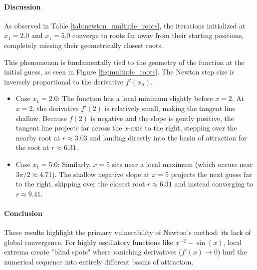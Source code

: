 \begin{solution}
	\paragraph{Discussion}
	As observed in Table \ref{tab:newton_multiple_roots}, the iterations
	initialized at $x_1 = 2.0$ and $x_1 = 5.0$ converge to roots far away from
	their starting positions, completely missing their geometrically closest
	roots.

	This phenomenon is fundamentally tied to the geometry of the function at the
	initial guess, as seen in Figure \ref{fig:multiple_roots}. The Newton step
	size is inversely proportional to the derivative $f'(x_n)$.
	\begin{itemize}
		\item Case $x_1 = 2.0$: The function has a local minimum
		      slightly before $x=2$. At $x=2$, the derivative $f'(2)$ is relatively
		      small, making the tangent line shallow. Because $f(2)$ is negative and
		      the slope is gently positive, the tangent line projects far across the
		      $x$-axis to the right, stepping over the nearby root at $r \approx 3.03$
		      and landing directly into the basin of attraction for the root at $r
			      \approx 6.31$.
		\item Case $x_1 = 5.0$: Similarly, $x=5$ sits near a local
		      maximum (which occurs near $3\pi/2 \approx 4.71$). The shallow negative
		      slope at $x=5$ projects the next guess far to the right, skipping over
		      the closest root $r \approx 6.31$ and instead converging to $r \approx
			      9.41$.
	\end{itemize}

	\paragraph{Conclusion}
	These results highlight the primary vulnerability of Newton's method: its
	lack of global convergence. For highly oscillatory functions like $x^{-2} -
		\sin(x)$, local extrema create "blind spots" where vanishing derivatives
	($f'(x) \to 0$) hurl the numerical sequence into entirely different basins
	of attraction.
\end{solution}

